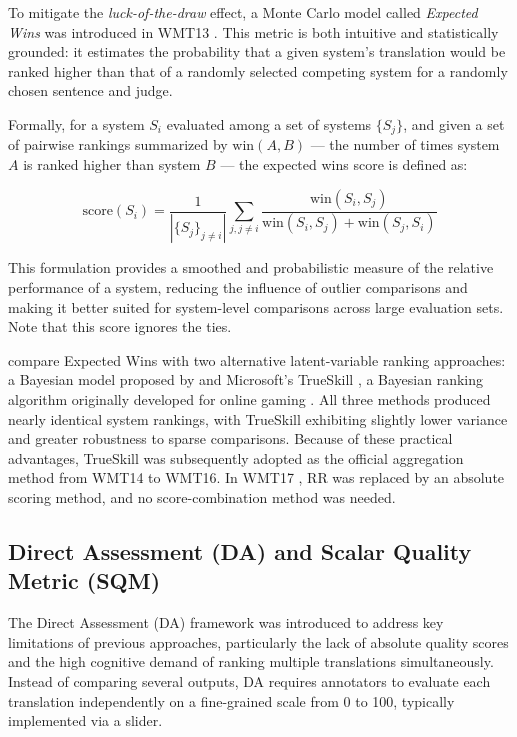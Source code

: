 To mitigate the \textit{luck-of-the-draw} effect, a Monte Carlo model called \emph{Expected Wins} \citep{koehn-2012-simulating} was introduced in WMT13 \citep{wmt13}. This metric is both intuitive and statistically grounded: it estimates the probability that a given system's translation would be ranked higher than that of a randomly selected competing system for a randomly chosen sentence and judge.

Formally, for a system \( S_i \) evaluated among a set of systems \( \{S_j\} \), and given a set of pairwise rankings summarized by \( \text{win}(A, B) \) --- the number of times system \( A \) is ranked higher than system \( B \) --- the expected wins score is defined as:

$$
\text{score}(S_i) = \frac{1}{|\{S_j\}_{j \ne i}|} \sum_{j, j \ne i} \frac{\text{win}(S_i, S_j)}{\text{win}(S_i, S_j) + \text{win}(S_j, S_i)}
$$

This formulation provides a smoothed and probabilistic measure of the relative performance of a system, reducing the influence of outlier comparisons and making it better suited for system-level comparisons across large evaluation sets. Note that this score ignores the ties.

\cite{wmt14} compare Expected Wins with two alternative latent-variable ranking approaches: a Bayesian model proposed by \cite{hopkins-may-2013-models} and Microsoft’s TrueSkill \citep{sakaguchi-etal-2014-efficient}, a Bayesian ranking algorithm originally developed for online gaming \citep{NIPS2006_f44ee263}. 
All three methods produced nearly identical system rankings, with TrueSkill exhibiting slightly lower variance and greater robustness to sparse comparisons. Because of these practical advantages, TrueSkill was subsequently adopted as the official aggregation method from WMT14 to WMT16. In WMT17 \citep{wmt17}, RR was replaced by an absolute scoring method, and no score-combination method was needed.


\subsection{Direct Assessment (DA) and Scalar Quality Metric (SQM)}
\label{sec:direct_assessment}
The Direct Assessment (DA) framework \citep{graham-etal-2013-continuous, graham-etal-2014-machine, graham_2017} was introduced to address key limitations of previous approaches, particularly the lack of absolute quality scores and the high cognitive demand of ranking multiple translations simultaneously. Instead of comparing several outputs, DA requires annotators to evaluate each translation independently on a fine-grained scale from 0 to 100, typically implemented via a slider. 

